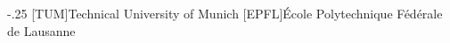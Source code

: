 \documentclass[headsepline,footsepline,footinclude=false,oneside,fontsize=10pt,paper=a4,listof=totoc,bibliography=totoc]{scrbook} %
\begin{document}


\frontmatter{}

%



\tableofcontents{}

\mainmatter{}



\appendix{}


\begin{acronym}
	\itemsep-.25\baselineskip
	[TUM]{Technical University of Munich}
	[EPFL]{École Polytechnique Fédérale de Lausanne}
\end{acronym}

\listoffigures{}
\listoftables{}
\printbibliography{}
\end{document}
